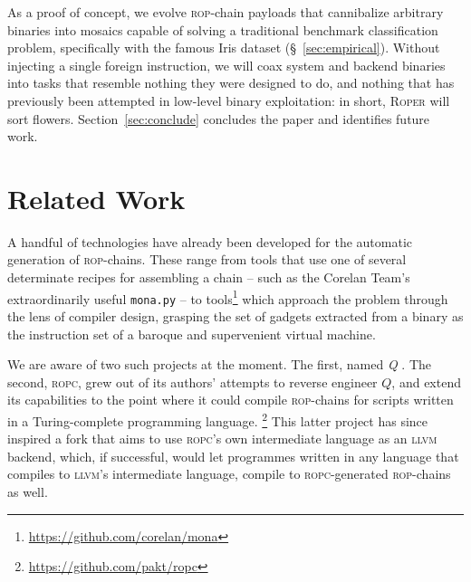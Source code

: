 As a proof of concept, we evolve \textsc{rop}-chain payloads that
cannibalize arbitrary binaries into mosaics capable of solving a
traditional benchmark classification problem, specifically with
the famous Iris dataset (\S~\ref{sec:empirical}). Without
injecting a single foreign instruction, we will coax system and
backend binaries into tasks that resemble nothing they were
designed to do, and nothing that has previously been attempted in
low-level binary exploitation: in short, \textsc{Roper} will sort
flowers. Section~\ref{sec:conclude} concludes the paper and
identifies future work.

\section{Related Work}\label{sec:RopBackgnd}






A handful of technologies have already been developed for the
automatic generation of \textsc{rop}-chains. These range from
tools that use one of several determinate recipes for assembling
a chain -- such as the {Corelan Team}'s extraordinarily useful
\texttt{mona.py} -- to tools\footnote{\url{https://github.com/corelan/mona}} which approach the problem through
the lens of compiler design, grasping the set of gadgets
extracted from a binary as the instruction set of a baroque and
supervenient virtual machine. %

We are aware of two such projects at the moment. The first, named
\emph{Q} \cite{shacham07}. The second, \textsc{ropc}, grew out of
its authors' attempts to reverse engineer $Q$, and extend its
capabilities to the point where it could compile
\textsc{rop}-chains for scripts written in a Turing-complete
programming language.%
\footnote{\url{https://github.com/pakt/ropc}} This latter project
has since inspired a fork that aims to use \textsc{ropc}'s own
intermediate language as an \textsc{llvm} backend, which, if
successful, would let programmes written in any language that
compiles to \textsc{llvm}'s intermediate language, compile to
\textsc{ropc}-generated \textsc{rop}-chains as well.  

